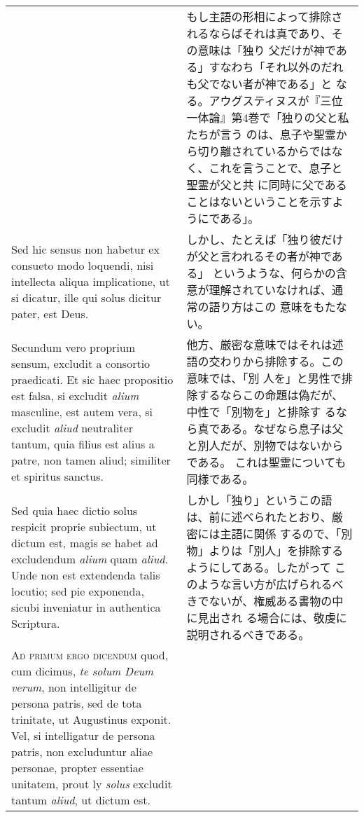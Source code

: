 \documentclass[10pt]{jsarticle} %
\begin{document}
\begin{longtable}{p{21em}p{21em}}
&

もし主語の形相によって排除されるならばそれは真であり、その意味は「独り
 父だけが神である」すなわち「それ以外のだれも父でない者が神である」と
 なる。アウグスティヌスが『三位一体論』第4巻で「独りの父と私たちが言う
 のは、息子や聖霊から切り離されているからではなく、これを言うことで、息子と聖霊が父と共
 に同時に父であることはないということを示すようにである」。

\\

Sed hic sensus non habetur ex
consueto modo loquendi, nisi intellecta aliqua implicatione, ut si
dicatur, ille qui solus dicitur pater, est Deus.  


&

しかし、たとえば「独り彼だけが父と言われるその者が神である」
 というような、何らかの含意が理解されていなければ、通常の語り方はこの
 意味をもたない。

\\

Secundum vero
proprium sensum, excludit a consortio praedicati.
Et sic haec
propositio est falsa, si excludit {\itshape alium} masculine, est autem vera, si
excludit {\itshape aliud} neutraliter tantum, quia filius est alius a patre, non
tamen aliud; similiter et spiritus sanctus. 


&

他方、厳密な意味ではそれは述語の交わりから排除する。この意味では、「別
 人を」と男性で排除するならこの命題は偽だが、中性で「別物を」と排除す
 るなら真である。なぜなら息子は父と別人だが、別物ではないからである。
 これは聖霊についても同様である。

\\

Sed quia haec dictio solus
respicit proprie subiectum, ut dictum est, magis se habet ad
excludendum {\itshape alium} quam {\itshape aliud}. Unde non est extendenda talis locutio;
sed pie exponenda, sicubi inveniatur in authentica Scriptura.

&

しかし「独り」というこの語は、前に述べられたとおり、厳密には主語に関係
 するので、「別物」よりは「別人」を排除するようにしてある。したがって
 このような言い方が広げられるべきでないが、権威ある書物の中に見出され
 る場合には、敬虔に説明されるべきである。


\\



{\scshape Ad primum ergo dicendum} quod, cum dicimus, {\itshape te solum Deum verum}, non
intelligitur de persona patris, sed de tota trinitate, ut Augustinus
exponit. Vel, si intelligatur de persona patris, non excluduntur aliae
personae, propter essentiae unitatem, prout ly {\itshape solus} excludit tantum
{\itshape aliud}, ut dictum est.


\end{longtable}
\end{document}

